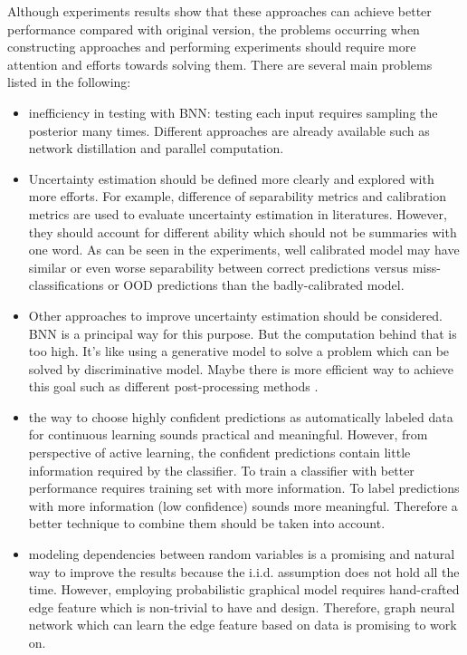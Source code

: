 Although experiments results show that these approaches can achieve better performance compared with original version, the problems occurring when constructing approaches and performing experiments should require more attention and efforts towards solving them. There are several main problems listed in the following:
\begin{itemize}
	\item inefficiency in testing with \gls{BNN}: testing each input requires sampling the posterior many times. Different approaches are already available such as network\cite{hinton2015distilling} distillation and parallel computation.  
	
	\item Uncertainty estimation should be defined more clearly and explored with more efforts. For example, difference of separability metrics and calibration metrics are used to evaluate uncertainty estimation in literatures\cite{hendrycks2016baseline}\cite{guo2017calibration}. However, they should account for different ability which should not be summaries with one word. As can be seen in the experiments, well calibrated model may have similar or even worse separability between correct predictions versus miss-classifications or \gls{OOD} predictions than the badly-calibrated model. 
	
	\item Other approaches to improve uncertainty estimation should be considered. \gls{BNN} is a principal way for this purpose. But the computation behind that is too high. It's like using a generative model to solve a problem which can be solved by discriminative model. Maybe there is more efficient way to achieve this goal such as different post-processing methods \cite{guo2017calibration}. 
	
	\item the way to choose highly confident predictions as automatically labeled data for continuous learning sounds practical and meaningful. However, from perspective of active learning, the confident predictions contain little information required by the classifier. To train a classifier with better performance requires training set with more information. To label predictions with more information (low confidence) sounds more meaningful. Therefore a better technique to combine them should be taken into account. 
	
	\item modeling dependencies between random variables is a promising and natural way to improve the results because the i.i.d. assumption does not hold all the time. However, employing probabilistic graphical model requires hand-crafted edge feature which is non-trivial to have and design. Therefore, graph neural network which can learn the edge feature based on data is promising to work on.
\end{itemize} 

